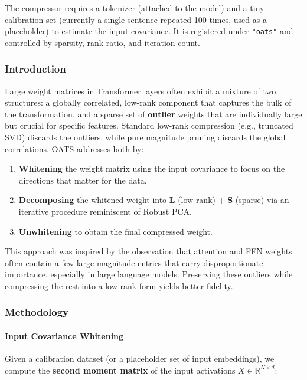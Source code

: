 The compressor requires a tokenizer (attached to the model) and a tiny calibration set (currently a single sentence repeated 100 times, used as a placeholder) to estimate the input covariance. It is registered under \texttt{"oats"} and controlled by sparsity, rank ratio, and iteration count.


\subsubsection*{Introduction}

Large weight matrices in Transformer layers often exhibit a mixture of two structures: a globally correlated, low-rank component that captures the bulk of the transformation, and a sparse set of \textbf{outlier} weights that are individually large but crucial for specific features. Standard low-rank compression (e.g., truncated SVD) discards the outliers, while pure magnitude pruning discards the global correlations. OATS addresses both by:

\begin{enumerate}
\item \textbf{Whitening} the weight matrix using the input covariance to focus on the directions that matter for the data.
\item \textbf{Decomposing} the whitened weight into \textbf{L} (low-rank) + \textbf{S} (sparse) via an iterative procedure reminiscent of Robust PCA.
\item \textbf{Unwhitening} to obtain the final compressed weight.

\end{enumerate}
This approach was inspired by the observation that attention and FFN weights often contain a few large-magnitude entries that carry disproportionate importance, especially in large language models. Preserving these outliers while compressing the rest into a low-rank form yields better fidelity.


\subsubsection*{Methodology}

\paragraph{Input Covariance Whitening}

Given a calibration dataset (or a placeholder set of input embeddings), we compute the \textbf{second moment matrix} of the input activations $X \in \mathbb{R}^{N \times d}$:

